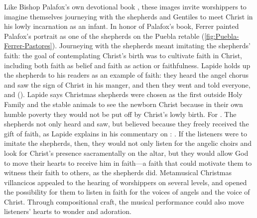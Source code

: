 Like Bishop Palafox's own devotional book ,
these images invite worshippers to imagine themselves journeying with the
shepherds and Gentiles to meet Christ in his lowly incarnation as an infant.%
    \Autocite{Palafox:Nochebuena}
In honor of Palafox's book, Ferrer painted Palafox's portrait as one of the
shepherds on the Puebla retable (\cref{fig:Puebla-Ferrer-Pastores}).%
    \Autocite[188--189]{Merlo:PueblaCat}
Journeying with the shepherds meant imitating the shepherds' faith: the goal of
contemplating Christ's birth was to cultivate faith in Christ, including both
faith as belief and faith as action or faithfulness.
Lapide holds up the shepherds to his readers as an example of faith: they heard
the angel chorus and saw the sign of Christ in his manger, and then they went
and told everyone, and  ().
Lapide says Christmas shepherds were chosen as the first outside Holy Family and
the stable animals to see the newborn Christ because in their own humble poverty
they would not be put off by Christ's lowly birth.
For .%
    \Autocite
    [677, on : .]
    {Lapide:Gospels19C}
The shepherds not only heard and saw, but believed because they freely received
the gift of faith, as Lapide explains in his commentary on
: .%
    \Autocite
    [882: .
    Lapide seems to have a polemical eye here on his Calvinist compatriots in
    the Low Countries.]
    {Lapide:Gospels19C}
If the listeners were to imitate the shepherds, then, they would not only listen
for the angelic choirs and look for Christ's presence sacramentally on the
altar, but they would allow God to move their hearts to receive him in faith---a
faith that could motivate them to witness their faith to others, as the
shepherds did.
Metamusical Christmas villancicos appealed to the hearing of worshippers on
several levels, and opened the possibility for them to listen in faith for the
voices of angels and the voice of Christ.
Through compositional craft, the musical performance could also move listeners'
hearts to wonder and adoration.

